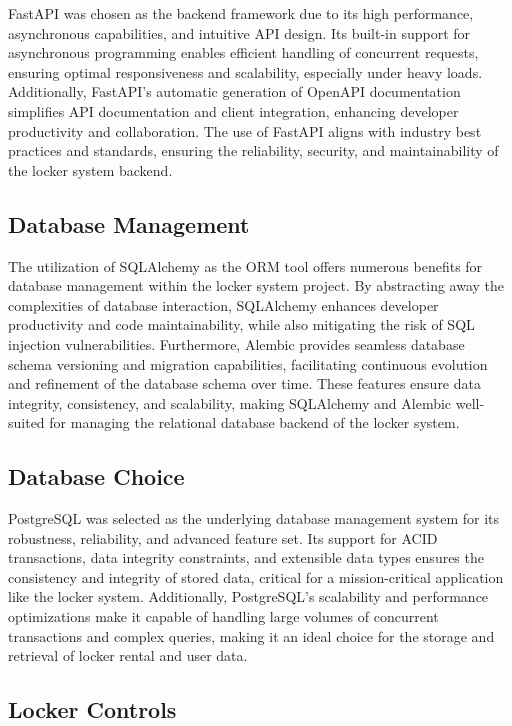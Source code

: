 FastAPI was chosen as the backend framework due to its high performance,
asynchronous capabilities, and intuitive API design. Its built-in support for
asynchronous programming enables efficient handling of concurrent requests,
ensuring optimal responsiveness and scalability, especially under heavy loads.
Additionally, FastAPI's automatic generation of OpenAPI documentation simplifies
API documentation and client integration, enhancing developer productivity and collaboration.
The use of FastAPI aligns with industry best practices and standards, ensuring the reliability,
security, and maintainability of the locker system backend.

\subsection{Database Management}

The utilization of SQLAlchemy as the ORM tool offers numerous benefits for database management
within the locker system project. By abstracting away the complexities of database interaction,
SQLAlchemy enhances developer productivity and code maintainability,
while also mitigating the risk of SQL injection vulnerabilities. Furthermore,
Alembic provides seamless database schema versioning and migration capabilities,
facilitating continuous evolution and refinement of the database schema over time.
These features ensure data integrity, consistency, and scalability, making SQLAlchemy
and Alembic well-suited for managing the relational database backend of the locker system.

\subsection{Database Choice}

PostgreSQL was selected as the underlying database management system for its robustness,
reliability, and advanced feature set. Its support for ACID transactions,
data integrity constraints, and extensible data types ensures the consistency and
integrity of stored data, critical for a mission-critical application like the locker system.
Additionally, PostgreSQL's scalability and performance optimizations make it capable
of handling large volumes of concurrent transactions and complex queries, making it an ideal
choice for the storage and retrieval of locker rental and user data.

\subsection{Locker Controls}

